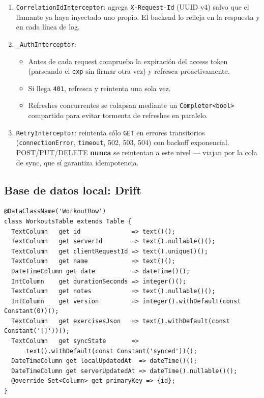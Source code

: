 \documentclass[11pt,a4paper]{article}
\newcommand{\cls}[1]{\texttt{\small #1}}
\begin{document}
\begin{enumerate}[leftmargin=*]
  \item \cls{CorrelationIdInterceptor}: agrega \texttt{X-Request-Id} (UUID v4) salvo que el llamante ya haya inyectado uno propio. El backend lo refleja en la respuesta y en cada línea de log.
  \item \cls{\_AuthInterceptor}:
    \begin{itemize}[leftmargin=*]
      \item Antes de cada request comprueba la expiración del access token (parseando el \texttt{exp} sin firmar otra vez) y refresca proactivamente.
      \item Si llega \texttt{401}, refresca y reintenta una sola vez.
      \item Refreshes concurrentes se colapsan mediante un \texttt{Completer<bool>} compartido para evitar tormenta de refreshes en paralelo.
    \end{itemize}
  \item \cls{RetryInterceptor}: reintenta sólo \texttt{GET} en errores transitorios (\texttt{connectionError}, \texttt{timeout}, 502, 503, 504) con backoff exponencial. POST/PUT/DELETE \textbf{nunca} se reintentan a este nivel — viajan por la cola de sync, que sí garantiza idempotencia.
\end{enumerate}

\subsection{Base de datos local: Drift}

\begin{lstlisting}[caption={Esquema Drift (Dart, fragmento).}]
@DataClassName('WorkoutRow')
class WorkoutsTable extends Table {
  TextColumn   get id              => text()();
  TextColumn   get serverId        => text().nullable()();
  TextColumn   get clientRequestId => text().unique()();
  TextColumn   get name            => text()();
  DateTimeColumn get date          => dateTime()();
  IntColumn    get durationSeconds => integer()();
  TextColumn   get notes           => text().nullable()();
  IntColumn    get version         => integer().withDefault(const Constant(0))();
  TextColumn   get exercisesJson   => text().withDefault(const Constant('[]'))();
  TextColumn   get syncState       =>
      text().withDefault(const Constant('synced'))();
  DateTimeColumn get localUpdatedAt  => dateTime()();
  DateTimeColumn get serverUpdatedAt => dateTime().nullable()();
  @override Set<Column> get primaryKey => {id};
}
\end{lstlisting}
\end{document}
